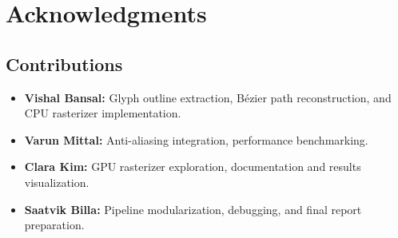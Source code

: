 \documentclass[11pt]{article}
\begin{document}
\section{Acknowledgments}

\subsection{Contributions}
\begin{itemize}[leftmargin=*,nosep]
    \item \textbf{Vishal Bansal:} Glyph outline extraction, Bézier path reconstruction, and CPU rasterizer implementation.
    \item \textbf{Varun Mittal:} Anti-aliasing integration, performance benchmarking.
    \item \textbf{Clara Kim:} GPU rasterizer exploration, documentation and results visualization.
    \item \textbf{Saatvik Billa:} Pipeline modularization, debugging, and final report preparation.
\end{itemize}
\par
\end{document}
